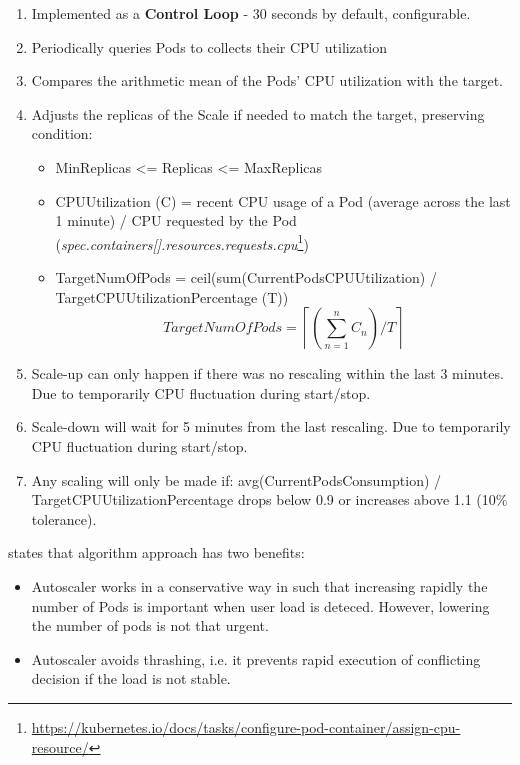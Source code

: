 \begin{enumerate}
\item Implemented as a \textbf{Control Loop} - 30 seconds by default, configurable.
\item Periodically queries Pods to collects their CPU utilization
\item Compares the arithmetic mean of the Pods' CPU utilization with the target.
\item Adjusts the replicas of the Scale if needed to match the target, preserving condition: 
	\begin{itemize}
	\item MinReplicas <= Replicas <= MaxReplicas
	\item CPUUtilization (C) = recent CPU usage of a Pod (average across the last 1 minute)  / CPU requested by the Pod (\textit{spec.containers[].resources.requests.cpu}\footnote{\url{https://kubernetes.io/docs/tasks/configure-pod-container/assign-cpu-resource/}})
	\item TargetNumOfPods = ceil(sum(CurrentPodsCPUUtilization) / TargetCPUUtilizationPercentage (T))
	\[ TargetNumOfPods = \left \lceil \left ( \sum_{n=1}^{n} C_{n}  \right )  / T  \right \rceil \]
	\end{itemize}

\item Scale-up can only happen if there was no rescaling within the last 3 minutes. Due to temporarily CPU fluctuation during start/stop.
\item Scale-down will wait for 5 minutes from the last rescaling. Due to temporarily CPU fluctuation during start/stop.
\item Any scaling will only be made if: avg(CurrentPodsConsumption) / TargetCPUUtilizationPercentage drops below 0.9 or increases above 1.1 (10\% tolerance).
\end{enumerate}

\noindent \parencite{kubeDoc} states that algorithm approach has two benefits:
\begin{itemize}
\item Autoscaler works in a conservative way in such that increasing rapidly the number of Pods is important when user load is deteced. However, lowering the number of pods is not that urgent.
\item Autoscaler avoids thrashing, i.e. it prevents rapid execution of conflicting decision if the load is not stable.
\end{itemize}



